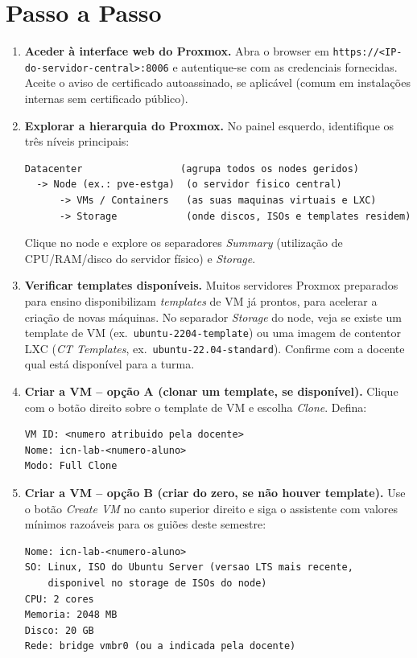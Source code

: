 \documentclass[11pt,a4paper]{article}
\begin{document}
\section{Passo a Passo}
\begin{enumerate}[label=\arabic*.]
  \item \textbf{Aceder à interface web do Proxmox.} Abra o browser em \texttt{https://<IP-do-servidor-central>:8006} e autentique-se com as credenciais fornecidas. Aceite o aviso de certificado autoassinado, se aplicável (comum em instalações internas sem certificado público).

  \item \textbf{Explorar a hierarquia do Proxmox.} No painel esquerdo, identifique os três níveis principais:
\begin{lstlisting}
Datacenter                 (agrupa todos os nodes geridos)
  -> Node (ex.: pve-estga)  (o servidor fisico central)
      -> VMs / Containers   (as suas maquinas virtuais e LXC)
      -> Storage            (onde discos, ISOs e templates residem)
\end{lstlisting}
  Clique no node e explore os separadores \emph{Summary} (utilização de CPU/RAM/disco do servidor físico) e \emph{Storage}.

  \item \textbf{Verificar templates disponíveis.} Muitos servidores Proxmox preparados para ensino disponibilizam \textit{templates} de VM já prontos, para acelerar a criação de novas máquinas. No separador \emph{Storage} do node, veja se existe um template de VM (ex.\ \texttt{ubuntu-2204-template}) ou uma imagem de contentor LXC (\emph{CT Templates}, ex.\ \texttt{ubuntu-22.04-standard}). Confirme com a docente qual está disponível para a turma.

  \item \textbf{Criar a VM -- opção A (clonar um template, se disponível).} Clique com o botão direito sobre o template de VM e escolha \emph{Clone}. Defina:
\begin{lstlisting}
VM ID: <numero atribuido pela docente>
Nome: icn-lab-<numero-aluno>
Modo: Full Clone
\end{lstlisting}

  \item \textbf{Criar a VM -- opção B (criar do zero, se não houver template).} Use o botão \emph{Create VM} no canto superior direito e siga o assistente com valores mínimos razoáveis para os guiões deste semestre:
\begin{lstlisting}
Nome: icn-lab-<numero-aluno>
SO: Linux, ISO do Ubuntu Server (versao LTS mais recente,
    disponivel no storage de ISOs do node)
CPU: 2 cores
Memoria: 2048 MB
Disco: 20 GB
Rede: bridge vmbr0 (ou a indicada pela docente)
\end{lstlisting}


\end{enumerate}
\end{document}
